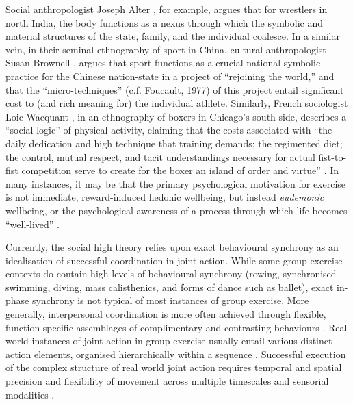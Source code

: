 \begin{CJK}{UTF8}{gbsn}
Social anthropologist Joseph Alter \textcite{Alter1993}, for example, argues that for wrestlers in north India, the body functions as a nexus through which the symbolic and material structures of the state, family, and the individual coalesce.  In a similar vein, in their seminal ethnography of sport in China, cultural anthropologist Susan Brownell \textcite{Brownell1995}, argues that sport functions as a crucial national symbolic practice for the Chinese nation-state in a project of ``rejoining the world,'' and that the ``micro-techniques'' (c.f. Foucault, 1977) of this project entail significant cost to (and rich meaning for) the individual athlete.   Similarly, French sociologist Loic Wacquant \textcite{Wacquant2004}, in an ethnography of boxers in Chicago's south side, describes a ``social logic'' of physical activity, claiming that the costs associated with ``the daily dedication and high technique that training demands; the regimented diet; the control, mutual respect, and tacit understandings necessary for actual fist-to-fist competition serve to create for the boxer an island of order and virtue'' \textcite[17]{Wacquant2004}. In many instances, it may be that the primary psychological motivation for exercise is not immediate, reward-induced hedonic wellbeing, but instead \textit{eudemonic} wellbeing, or the psychological awareness of a process through which life becomes ``well-lived'' \citep{Fave2009,Huta2013}.




Currently, the social high theory relies upon exact behavioural synchrony as an idealisation of successful coordination in joint action.  While some group exercise contexts do contain high levels of behavioural synchrony (rowing, synchronised swimming, diving, mass calisthenics, and forms of dance such as ballet), exact in-phase synchrony is not typical of most instances of group exercise.  More generally, interpersonal coordination is more often achieved through flexible, function-specific assemblages of complimentary and contrasting behaviours \citep[for example, coordination in an interactional team sport, a dyadic conversation, or an ensemble music performance, see][]{Fusaroli2014}.  Real world instances of joint action in group exercise usually entail various distinct action elements, organised hierarchically within a sequence \citep{Schmidt1975,Rosenbaum2009}.  Successful execution of the complex structure of real world joint action requires temporal and spatial precision and flexibility of movement across multiple timescales and sensorial modalities \citep{Sebanz2006}.


\end{CJK}
